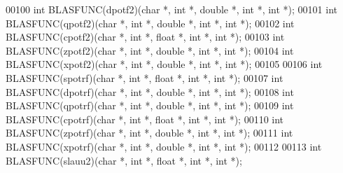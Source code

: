 \begin{DoxyCode}
00100 \textcolor{keywordtype}{int} BLASFUNC(dpotf2)(\textcolor{keywordtype}{char} *, \textcolor{keywordtype}{int} *, \textcolor{keywordtype}{double} *, \textcolor{keywordtype}{int} *, \textcolor{keywordtype}{int} *);
00101 \textcolor{keywordtype}{int} BLASFUNC(qpotf2)(\textcolor{keywordtype}{char} *, \textcolor{keywordtype}{int} *, \textcolor{keywordtype}{double} *, \textcolor{keywordtype}{int} *, \textcolor{keywordtype}{int} *);
00102 \textcolor{keywordtype}{int} BLASFUNC(cpotf2)(\textcolor{keywordtype}{char} *, \textcolor{keywordtype}{int} *, \textcolor{keywordtype}{float}  *, \textcolor{keywordtype}{int} *, \textcolor{keywordtype}{int} *);
00103 \textcolor{keywordtype}{int} BLASFUNC(zpotf2)(\textcolor{keywordtype}{char} *, \textcolor{keywordtype}{int} *, \textcolor{keywordtype}{double} *, \textcolor{keywordtype}{int} *, \textcolor{keywordtype}{int} *);
00104 \textcolor{keywordtype}{int} BLASFUNC(xpotf2)(\textcolor{keywordtype}{char} *, \textcolor{keywordtype}{int} *, \textcolor{keywordtype}{double} *, \textcolor{keywordtype}{int} *, \textcolor{keywordtype}{int} *);
00105 
00106 \textcolor{keywordtype}{int} BLASFUNC(spotrf)(\textcolor{keywordtype}{char} *, \textcolor{keywordtype}{int} *, \textcolor{keywordtype}{float}  *, \textcolor{keywordtype}{int} *, \textcolor{keywordtype}{int} *);
00107 \textcolor{keywordtype}{int} BLASFUNC(dpotrf)(\textcolor{keywordtype}{char} *, \textcolor{keywordtype}{int} *, \textcolor{keywordtype}{double} *, \textcolor{keywordtype}{int} *, \textcolor{keywordtype}{int} *);
00108 \textcolor{keywordtype}{int} BLASFUNC(qpotrf)(\textcolor{keywordtype}{char} *, \textcolor{keywordtype}{int} *, \textcolor{keywordtype}{double} *, \textcolor{keywordtype}{int} *, \textcolor{keywordtype}{int} *);
00109 \textcolor{keywordtype}{int} BLASFUNC(cpotrf)(\textcolor{keywordtype}{char} *, \textcolor{keywordtype}{int} *, \textcolor{keywordtype}{float}  *, \textcolor{keywordtype}{int} *, \textcolor{keywordtype}{int} *);
00110 \textcolor{keywordtype}{int} BLASFUNC(zpotrf)(\textcolor{keywordtype}{char} *, \textcolor{keywordtype}{int} *, \textcolor{keywordtype}{double} *, \textcolor{keywordtype}{int} *, \textcolor{keywordtype}{int} *);
00111 \textcolor{keywordtype}{int} BLASFUNC(xpotrf)(\textcolor{keywordtype}{char} *, \textcolor{keywordtype}{int} *, \textcolor{keywordtype}{double} *, \textcolor{keywordtype}{int} *, \textcolor{keywordtype}{int} *);
00112 
00113 \textcolor{keywordtype}{int} BLASFUNC(slauu2)(\textcolor{keywordtype}{char} *, \textcolor{keywordtype}{int} *, \textcolor{keywordtype}{float}  *, \textcolor{keywordtype}{int} *, \textcolor{keywordtype}{int} *);

\end{DoxyCode}
